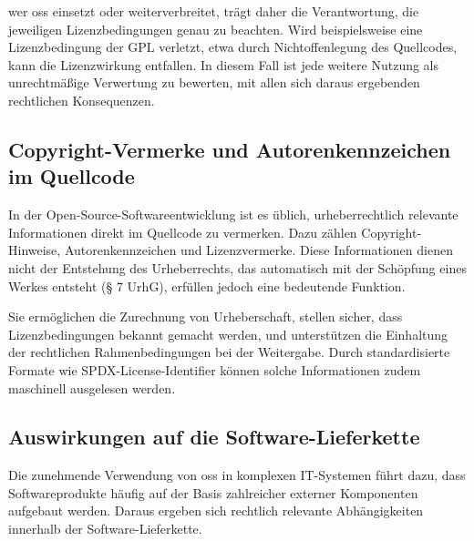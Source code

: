 wer \gls{oss} einsetzt oder weiterverbreitet, trägt daher die Verantwortung, die jeweiligen Lizenzbedingungen genau zu beachten.
Wird beispielsweise eine Lizenzbedingung der GPL verletzt, etwa durch Nichtoffenlegung des Quellcodes, kann die Lizenzwirkung entfallen.
In diesem Fall ist jede weitere Nutzung als unrechtmäßige Verwertung zu bewerten, mit allen sich daraus ergebenden rechtlichen Konsequenzen.


\subsection{Copyright-Vermerke und Autorenkennzeichen im Quellcode}

In der Open-Source-Softwareentwicklung ist es üblich, urheberrechtlich relevante Informationen direkt im Quellcode zu vermerken.
Dazu zählen Copyright-Hinweise, Autorenkennzeichen und Lizenzvermerke.
Diese Informationen dienen nicht der Entstehung des Urheberrechts, das automatisch mit der Schöpfung eines Werkes entsteht (§ 7 UrhG), erfüllen jedoch eine bedeutende Funktion.

Sie ermöglichen die Zurechnung von Urheberschaft, stellen sicher, dass Lizenzbedingungen bekannt gemacht werden, und unterstützen die Einhaltung der rechtlichen Rahmenbedingungen bei der Weitergabe.
Durch standardisierte Formate wie SPDX-License-Identifier können solche Informationen zudem maschinell ausgelesen werden.



\subsection{Auswirkungen auf die Software-Lieferkette}

Die zunehmende Verwendung von \gls{oss} in komplexen IT-Systemen führt dazu, dass Softwareprodukte häufig auf der Basis zahlreicher externer Komponenten aufgebaut werden.
Daraus ergeben sich rechtlich relevante Abhängigkeiten innerhalb der Software-Lieferkette.

